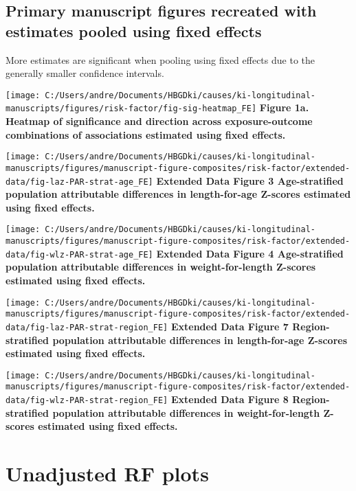 \documentclass[
  9pt,
]{book}
\begin{document}
\hypertarget{primary-manuscript-figures-recreated-with-estimates-pooled-using-fixed-effects}{%
\section{Primary manuscript figures recreated with estimates pooled using fixed effects}\label{primary-manuscript-figures-recreated-with-estimates-pooled-using-fixed-effects}}

More estimates are significant when pooling using fixed effects due to the generally smaller confidence intervals.

\texttt{[image: C:/Users/andre/Documents/HBGDki/causes/ki-longitudinal-manuscripts/figures/risk-factor/fig-sig-heatmap\_FE]}
\textbf{Figure 1a. Heatmap of significance and direction across exposure-outcome combinations of associations estimated using fixed effects. }

\texttt{[image: C:/Users/andre/Documents/HBGDki/causes/ki-longitudinal-manuscripts/figures/manuscript-figure-composites/risk-factor/extended-data/fig-laz-PAR-strat-age\_FE]}
\textbf{Extended Data Figure 3 \textbar{} Age-stratified population attributable differences in length-for-age Z-scores estimated using fixed effects. }

\texttt{[image: C:/Users/andre/Documents/HBGDki/causes/ki-longitudinal-manuscripts/figures/manuscript-figure-composites/risk-factor/extended-data/fig-wlz-PAR-strat-age\_FE]}
\textbf{Extended Data Figure 4 \textbar{} Age-stratified population attributable differences in weight-for-length Z-scores estimated using fixed effects. }

\texttt{[image: C:/Users/andre/Documents/HBGDki/causes/ki-longitudinal-manuscripts/figures/manuscript-figure-composites/risk-factor/extended-data/fig-laz-PAR-strat-region\_FE]}
\textbf{Extended Data Figure 7 \textbar{} Region-stratified population attributable differences in length-for-age Z-scores estimated using fixed effects. }

\texttt{[image: C:/Users/andre/Documents/HBGDki/causes/ki-longitudinal-manuscripts/figures/manuscript-figure-composites/risk-factor/extended-data/fig-wlz-PAR-strat-region\_FE]}
\textbf{Extended Data Figure 8 \textbar{} Region-stratified population attributable differences in weight-for-length Z-scores estimated using fixed effects. }

\hypertarget{unadjusted}{%
\chapter{Unadjusted RF plots}\label{unadjusted}}
\end{document}
